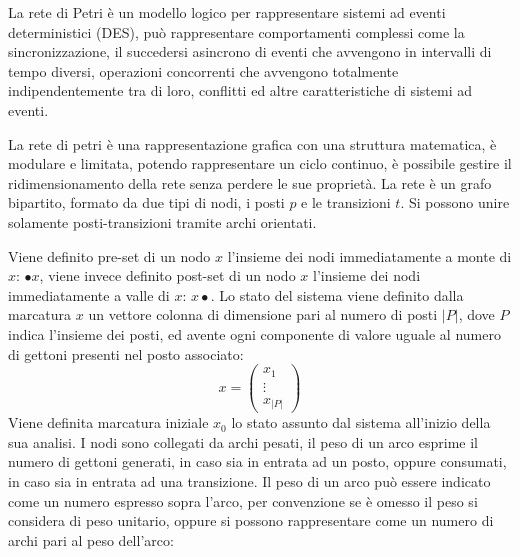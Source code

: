 \documentclass{article}
\numberwithin{equation}{subsection}
\begin{document}
La rete di Petri è un modello logico per rappresentare sistemi ad eventi deterministici (DES), può rappresentare comportamenti complessi come la sincronizzazione, il succedersi 
asincrono di eventi che avvengono in intervalli di tempo diversi, operazioni concorrenti che avvengono totalmente indipendentemente tra di loro, conflitti ed altre 
caratteristiche di sistemi ad eventi. 

La rete di petri è una rappresentazione grafica con una struttura matematica, è modulare e limitata, potendo rappresentare un ciclo continuo, è possibile gestire il ridimensionamento 
della rete senza perdere le sue proprietà. La rete è un grafo bipartito, formato da due tipi di nodi, i posti $p$ e le transizioni $t$. Si possono unire solamente posti-transizioni 
tramite archi orientati. 
\begin{center}
\end{center}
Viene definito pre-set di un nodo $x$ l'insieme dei nodi immediatamente a monte di $x$: $\bullet x$, viene invece definito post-set di un nodo $x$ l'insieme dei nodi 
immediatamente a valle di $x$: $x\bullet$. Lo stato del sistema viene definito dalla marcatura $x$ un vettore colonna di dimensione pari al numero di posti $|P|$, dove $P$ 
indica l'insieme dei posti, ed avente ogni componente di valore uguale al numero di gettoni presenti nel posto associato:
\begin{equation*}
    x=\begin{pmatrix}
        x_1\\
        \vdots\\
        x_{|P|}
    \end{pmatrix}
\end{equation*}
Viene definita marcatura iniziale $x_0$ lo stato assunto dal sistema all'inizio della sua analisi. 
I nodi sono collegati da archi pesati, il peso di un arco esprime il numero di gettoni generati, in caso sia in entrata ad un posto, oppure consumati, in caso sia in entrata 
ad una transizione. Il peso di un arco può essere indicato come un numero espresso sopra l'arco, per convenzione se è omesso il peso si considera di peso unitario, oppure 
si possono rappresentare come un numero di archi pari al peso dell'arco:
\begin{center}
\end{center}
\end{document}
